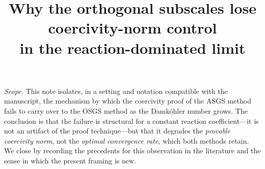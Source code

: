\documentclass[11pt]{article}
\title{Why the orthogonal subscales lose coercivity-norm control \\[2pt]
in the reaction-dominated limit}
\author{}
\date{}
\theoremstyle{plain}
\theoremstyle{remark}
\begin{document}
\maketitle

\noindent
\textit{Scope.}\; This note isolates, in a setting and notation compatible with the
manuscript, the mechanism by which the coercivity proof of the ASGS method fails
to carry over to the OSGS method as the Damk\"ohler number grows. The conclusion
is that the failure is structural for a constant reaction coefficient---it is not
an artifact of the proof technique---but that it degrades the \emph{provable
coercivity norm}, not the \emph{optimal convergence rate}, which both methods
retain. We close by recording the precedents for this observation in the
literature and the sense in which the present framing is new.

\end{document}
